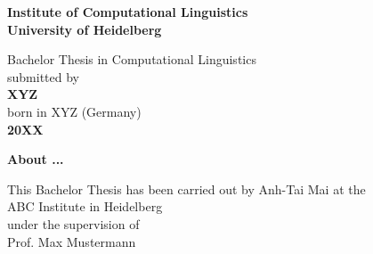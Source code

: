 \begin{titlepage}
\begin{center}
 
\Large\textbf{Institute of Computational Linguistics\\
University of Heidelberg}

\vspace{18cm}

\normalsize
Bachelor Thesis in Computational Linguistics\\
submitted by\\
\vspace{0.5cm}
\Large\textbf{XYZ}\\
\normalsize
\vspace{0.5cm}
born in XYZ (Germany)\\
\vspace{0.5cm}
\Large\textbf{20XX}
\normalsize

\newpage




\Large\textbf{About ...}

\vspace{18cm}

\normalsize
This Bachelor Thesis has been carried out by Anh-Tai Mai at the\\
ABC Institute in Heidelberg\\
under the supervision of\\
Prof. Max Mustermann

\vfill
\end{center}

\end{titlepage}
